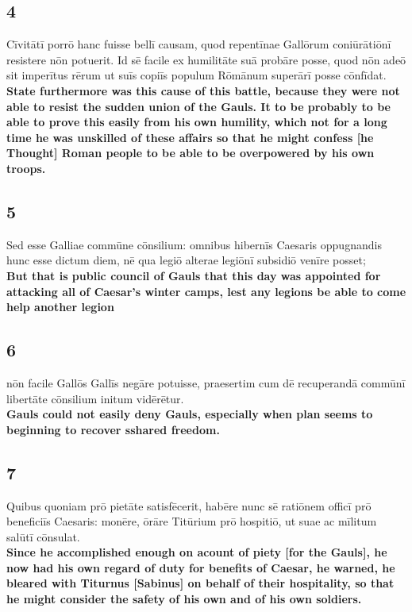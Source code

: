 \documentclass{article}
\begin{document}
\subsection*{4}
Cīvitātī porrō hanc fuisse bellī causam, quod repentīnae Gallōrum coniūrātiōnī resistere nōn potuerit. Id sē facile ex humilitāte suā probāre posse, quod nōn adeō sit imperītus rērum ut suīs copiīs populum Rōmānum superārī posse cōnfīdat.\\
\textbf{State furthermore was this cause of this battle, because they were not able to resist the sudden union of the Gauls. It to be probably to be able to prove this easily from his own humility, which not for a long time he was unskilled of these affairs so that he might confess [he Thought] Roman people to be able to be overpowered by his own troops.}

\subsection*{5}
Sed esse Galliae commūne cōnsilium: omnibus hibernīs Caesaris oppugnandis hunc esse dictum diem, nē qua legiō alterae legiōnī subsidiō venīre posset;\\
\textbf{But that is public council of Gauls that this day was appointed for attacking all of Caesar's winter camps, lest any legions be able to come help another legion}

\subsection*{6}
nōn facile Gallōs Gallīs negāre potuisse, praesertim cum dē recuperandā commūnī libertāte cōnsilium initum vidērētur.\\
\textbf{Gauls could not easily deny Gauls, especially when plan seems to beginning to recover sshared freedom. }

\subsection*{7}
Quibus quoniam prō pietāte satisfēcerit, habēre nunc sē ratiōnem officī prō beneficiīs Caesaris: monēre, ōrāre Titūrium prō hospitiō, ut suae ac mīlitum salūtī cōnsulat.\\
\textbf{Since he accomplished enough on acount of piety [for the Gauls], he now had his own regard of duty for benefits of Caesar, he warned, he bleared with Titurnus [Sabinus] on behalf of their hospitality, so that he might consider the safety of his own and of his own soldiers. }
\end{document}
